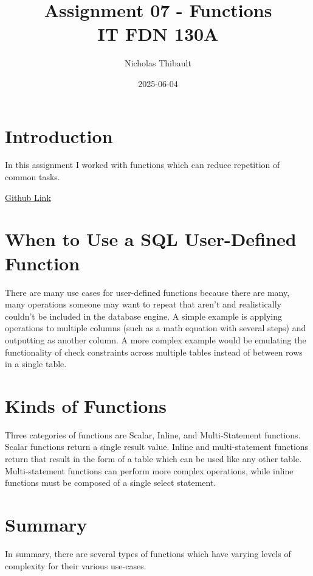 \documentclass{article}
\title{Assignment 07 - Functions \\
\large{IT FDN 130A}}
\author{Nicholas Thibault}
\date{2025-06-04}
\begin{document}
\maketitle

\section*{Introduction}
In this assignment I worked with functions which can reduce repetition of common tasks.

\href{https://github.com/Dilong-paradoxus/DBFoundations-Module07}{Github Link}
\section*{When to Use a SQL User-Defined Function}
There are many use cases for user-defined functions because there are many, many operations someone may want to repeat that aren't and realistically couldn't be included in the database engine. A simple example is applying operations to multiple columns (such as a math equation with several steps) and outputting as another column. A more complex example would be emulating the functionality of check constraints across multiple tables instead of between rows in a single table. 
\section*{Kinds of Functions}
Three categories of functions are Scalar, Inline, and Multi-Statement functions. Scalar functions return a single result value.\cite{SQLscalarG4g} Inline and multi-statement functions return that result in the form of a table which can be used like any other table.\cite{SQLinlineg4g} Multi-statement functions can perform more complex operations, while inline functions must be composed of a single select statement.\cite{SQLmultistatementg4g}
\section*{Summary}
In summary, there are several types of functions which have varying levels of complexity for their various use-cases.
\printbibliography
\end{document}
